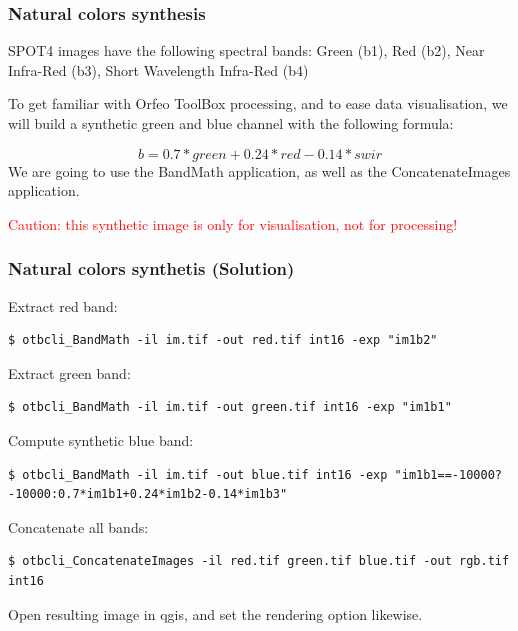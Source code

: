 \documentclass[8pt]{beamer}
\begin{document}
\begin{frame}
\frametitle{Natural colors synthesis} 
SPOT4 images have the following spectral bands: Green (b1), Red (b2), Near Infra-Red (b3), Short Wavelength Infra-Red (b4)

To get familiar with Orfeo ToolBox processing, and to ease data
visualisation, we will build a synthetic green and blue channel with the following formula:

\begin{equation}
b=0.7*green+0.24*red-0.14*swir
\end{equation}
We are going to use the BandMath application, as well as the ConcatenateImages application.

\textcolor{red}{Caution: this synthetic image is only for visualisation, not for processing!}

\end{frame}
\begin{frame}[fragile]
\frametitle{Natural colors synthetis (Solution)}
Extract red band:
\begin{scriptsize}
\begin{verbatim}
$ otbcli_BandMath -il im.tif -out red.tif int16 -exp "im1b2"
\end{verbatim}
\end{scriptsize}
Extract green band:
\begin{scriptsize}
\begin{verbatim}
$ otbcli_BandMath -il im.tif -out green.tif int16 -exp "im1b1"
\end{verbatim}
\end{scriptsize}
Compute synthetic blue band:
\begin{scriptsize}
\begin{verbatim}
$ otbcli_BandMath -il im.tif -out blue.tif int16 -exp "im1b1==-10000?-10000:0.7*im1b1+0.24*im1b2-0.14*im1b3"
\end{verbatim}
\end{scriptsize}
Concatenate all bands:
\begin{scriptsize}
\begin{verbatim}
$ otbcli_ConcatenateImages -il red.tif green.tif blue.tif -out rgb.tif int16
\end{verbatim}
\end{scriptsize}

Open resulting image in qgis, and set the rendering option likewise.

\end{frame}
\end{document}
